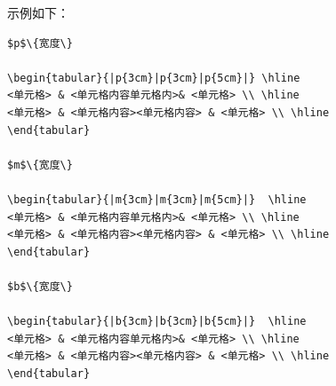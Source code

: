 \documentclass[cn,chinese,color=cyan]{elegantbook}
\begin{document}
示例如下：
\begin{lstlisting}[style=R]
$p$\{宽度\}

\begin{tabular}{|p{3cm}|p{3cm}|p{5cm}|} \hline
<单元格> & <单元格内容单元格内>& <单元格> \\ \hline
<单元格> & <单元格内容><单元格内容> & <单元格> \\ \hline
\end{tabular}
	
$m$\{宽度\}

\begin{tabular}{|m{3cm}|m{3cm}|m{5cm}|}  \hline
<单元格> & <单元格内容单元格内>& <单元格> \\ \hline
<单元格> & <单元格内容><单元格内容> & <单元格> \\ \hline
\end{tabular}

$b$\{宽度\}

\begin{tabular}{|b{3cm}|b{3cm}|b{5cm}|}  \hline
<单元格> & <单元格内容单元格内>& <单元格> \\ \hline
<单元格> & <单元格内容><单元格内容> & <单元格> \\ \hline
\end{tabular}
\end{lstlisting}
\end{document}
